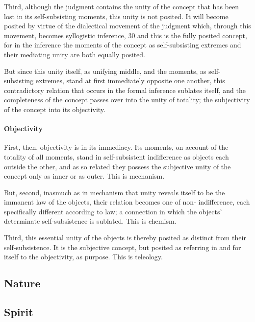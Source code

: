\documentclass{article}
\begin{document}
Third, although the judgment contains the unity of the concept that
has been lost in its self-subsisting moments, this unity is not posited. It
will become posited by virtue of the dialectical movement of the judgment
which, through this movement, becomes syllogistic inference, 30 and this is
the fully posited concept, for in the inference the moments of the concept
as self-subsisting extremes and their mediating unity are both equally posited.

But since this unity itself, as unifying middle, and the moments, as self-
subsisting extremes, stand at first immediately opposite one another, this
contradictory relation that occurs in the formal inference sublates itself, and
the completeness of the concept passes over into the unity of totality; the
subjectivity of the concept into its objectivity.

\paragraph{Objectivity}

First, then, objectivity is in its immediacy. Its moments, on account of
the totality of all moments, stand in self-subsistent indifference as objects
each outside the other, and as so related they possess the subjective unity of
the concept only as inner or as outer. This is mechanism.

But, second, inasmuch as in mechanism that unity reveals itself to be
the immanent law of the objects, their relation becomes one of non-
indifference, each specifically different according to law; a connection in
which the objects’ determinate self-subsistence is sublated. This is chemism.

Third, this essential unity of the objects is thereby posited as distinct
from their self-subsistence. It is the subjective concept, but posited as
referring in and for itself to the objectivity, as purpose. This is teleology.

\subsection{Nature}
\subsection{Spirit}
\end{document}
